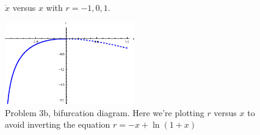 \documentclass{article}
\theoremstyle{definition}
\begin{document}
\begin{enumerate}[label=(\alph*)]
	
	\begin{figure}[!htb]
		\centering
		\caption{$\dot x$ versus $x$ with $r=-1,0,1$.}
		\label{fig:3b1}
	\end{figure}
	
	
	\begin{figure}[!htb]
		\centering
		\includegraphics[width=0.5\textwidth]{bif-3b.eps}
		\caption{Problem 3b, bifurcation diagram. Here we're plotting $r$ versus $x$ to avoid inverting the equation $r = -x + \ln(1+x)$}
		\label{fig:bif-3b}
	\end{figure}
	
	
	

\end{enumerate}
\end{document}
